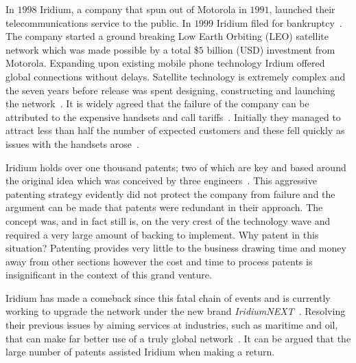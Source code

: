 {}

In $1998$ Iridium, a company that spun out of Motorola in $1991$, launched their telecommunications service to the public.
In $1999$ Iridium filed for bankruptcy~\cite{fink2000iridium}.%
The company started a ground breaking Low Earth Orbiting (LEO) satellite network which was made possible by a total \$$5$ billion (USD) investment from Motorola.
Expanding upon existing mobile phone technology Irdium offered global connections without delays.
Satellite technology is extremely complex and the seven years before release was spent designing, constructing and launching the network~\cite{fink2000iridium}. 
It is widely agreed that the failure of the company can be attributed to the expensive handsets and call tariffs~\cite{fink2000iridium}.
Initially they managed to attract less than half the number of expected customers and these fell quickly as issues with the handsets arose~\cite{bill1999}.


Iridium holds over one thousand patents; two of which are key and based around the original idea which was conceived by three engineers~\cite{ip2010,bertiger1995satellite,bertiger1997satellite}.
This aggressive patenting strategy evidently did not protect the company from failure and the argument can be made that patents were redundant in their approach.
The concept was, and in fact still is, on the very crest of the technology wave and required a very large amount of backing to implement.
Why patent in this situation?
Patenting provides very little to the business drawing time and money away from other sections however the cost and time to process patents is insignificant in the context of this grand venture.


Iridium has made a comeback since this fatal chain of events and is currently working to upgrade the network under the new brand \emph{IridiumNEXT}~\cite{iridiumNEXT}.
Resolving their previous issues by aiming services at industries, such as maritime and oil, that can make far better use of a truly global network~\cite{better2009}.
It can be argued that the large number of patents assisted Iridium when making a return.  

